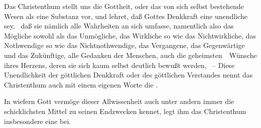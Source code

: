 Das Christenthum stellt uns die Gottheit, oder das von sich selbst bestehende Wesen als eine  Substanz vor, und lehret, daß Gottes Denkkraft eine unendliche sey, \dh\ daß sie  nämlich alle Wahrheiten an sich umfasse, namentlich also das Mögliche sowohl als das Unmögliche, das Wirkliche so wie das Nichtwirkliche, das Nothwendige so wie das Nichtnothwendige, das Vergangene, das Gegenwärtige und das Zukünftige, alle Gedanken der Menschen, auch die geheimsten~\ Wünsche ihres Herzens, deren sie sich kaum selbst deutlich bewußt werden, \usw\ -- Diese Unendlichkeit der göttlichen Denkkraft oder des göttlichen Verstandes nennt das Christenthum auch mit einem eigenen Worte die .\par
In wiefern Gott vermöge dieser Allwissenheit auch unter andern immer die schicklichsten Mittel zu seinen Endzwecken kennet, legt ihm das Christenthum insbesondere eine  bei.

